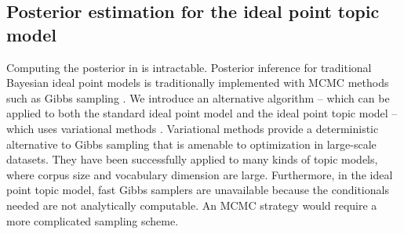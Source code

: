 









\subsection{Posterior estimation for the ideal point topic model}
\label{sec:inference}
Computing the posterior in  is intractable.  Posterior
inference for traditional Bayesian ideal point models is traditionally
implemented with MCMC methods such as Gibbs sampling
\cite{johnson:1999ch6,jackman:2001,martin:2002,clinton:2004}.  We
introduce an alternative algorithm -- which can be applied to both the
standard ideal point model and the ideal point topic model -- which
uses variational methods \cite{jordan:1999}.  Variational methods
provide a deterministic alternative to Gibbs sampling that is amenable
to optimization in large-scale datasets.  They have been successfully
applied to many kinds of topic models, where corpus size and
vocabulary dimension are large.  Furthermore, in the ideal point topic
model, fast Gibbs samplers are unavailable because the conditionals
needed are not analytically computable.  An MCMC strategy would
require a more complicated sampling scheme.

